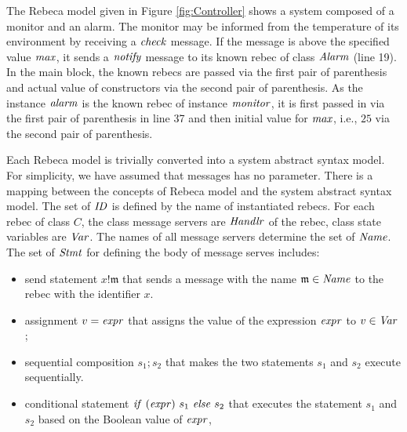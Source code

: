\begin{example}
The Rebeca model given in Figure \ref{fig:Controller} shows a system composed of a monitor and an alarm. The monitor may be informed from the temperature of its environment by receiving a $\it check$ message. If the message is above the specified value $\it max$, it sends a $\it notify$ message to its known rebec of class $\it Alarm$ (line 19). In the main block, the known rebecs are passed via the first pair of parenthesis and actual value of constructors via the second pair of parenthesis. As the instance $\it alarm$ is the known rebec of instance $\it monitor$, it is first passed in via the first pair of parenthesis in line 37 and then initial value for $\it max$, i.e., $25$ via the second pair of parenthesis. 
\end{example}

Each Rebeca model is trivially converted into a system abstract syntax model. For simplicity, we have assumed that messages has no parameter. There is a mapping between the concepts of Rebeca model and the system abstract syntax model. The set of $\mathit{ID}$ is defined by the name of instantiated rebecs. For each rebec of class $C$, the class message servers are $\mathit{Handlr}$ of the rebec, class state variables are $\mathit{Var}$. %
The names of all message servers determine the set of $\mathit{Name}$. The set of $\mathit{Stmt}$ for defining the body of message serves includes:\begin{itemize}
    \item send statement $x!\mathfrak{m}$ that sends a message with the name $\mathfrak{m}\in\mathit{Name}$ to the rebec with the identifier $x$.
    \item assignment $v={\it expr}$ that assigns the value of the expression ${\it expr}$ to $v\in\mathit{Var}$;
    \item sequential composition $s_1;s_2$ that makes the two statements $s_1$ and $s_2$ execute sequentially.
    \item conditional statement ${\it if}~ (\mathit{expr}) ~s_1 ~{\it else}~s_2 $ that executes the statement $s_1$ and $s_2$ based on the Boolean value of $\mathit{expr}$,
\end{itemize}

